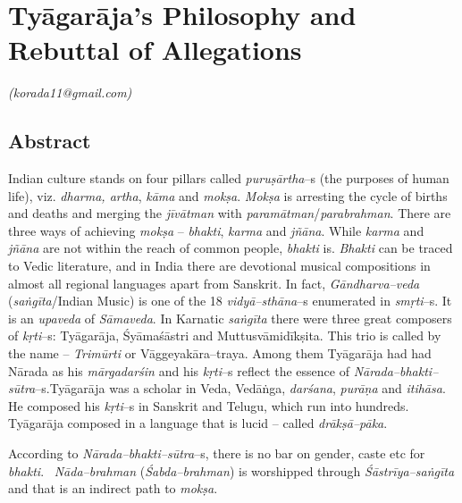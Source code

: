 
\chapter{Tyāgarāja’s Philosophy and Rebuttal of Allegations}\label{chapter3}


\begin{flushright}
\textit{(korada11@gmail.com)}
\end{flushright}


\section*{Abstract}

Indian culture stands on four pillars called \textit{puruṣārtha}–s (the purposes of human life), viz. \textit{dharma, artha}, \textit{kāma} and \textit{mokṣa}. \textit{Mokṣa} is arresting the cycle of births and deaths and merging the \textit{jīvātman} with \textit{paramātman}/\textit{parabrahman}. There are three ways of achieving \textit{mokṣa} – \textit{bhakti}, \textit{karma} and \textit{jñāna}. While \textit{karma} and \textit{jñāna} are not within the reach of common people, \textit{bhakti} is. \textit{Bhakti} can be traced to Vedic literature, and in India there are devotional musical compositions in almost all regional languages apart from Sanskrit. In fact, \textit{Gāndharva–veda} (\textit{saṅgīta}/Indian Music) is one of the 18 \textit{vidyā–sthāna}–s enumerated in \textit{smṛti}–s. It is an \textit{upaveda} of \textit{Sāmaveda}. In Karnatic \textit{saṅgīta} there were three great composers of \textit{kṛti}–s: Tyāgarāja, Śyāmaśāstri and Muttusvāmidīkṣita. This trio is called by the name – \textit{Trimūrti} or Vāggeyakāra–traya. Among them Tyāgarāja had had Nārada as his \textit{mārgadarśin} and his \textit{kṛti}–s reflect the essence of \textit{Nārada–bhakti–sūtra}–s.\break Tyāgarāja was a scholar in Veda, Vedāṅga, \textit{darśana}, \textit{purāṇa} and \textit{itihāsa}. He composed his \textit{kṛti}–s in Sanskrit and Telugu, which run into hundreds. Tyāgarāja composed in a language that is lucid – called \textit{drākṣā–pāka}. 

According to \textit{Nārada–bhakti–sūtra}–s, there is no bar on gender, caste etc for \textit{bhakti}.  \textit{Nāda–brahman} (\textit{Śabda–brahman}) is worshipped through \textit{Śāstrīya–saṅgīta} and that is an indirect path to \textit{mokṣa}. 


